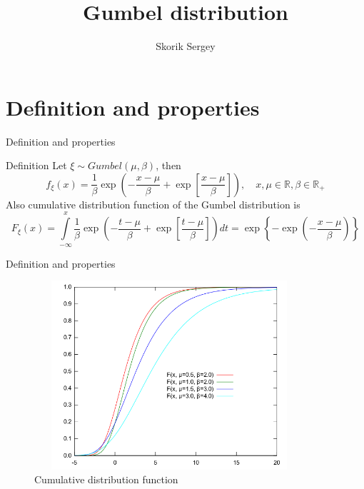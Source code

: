 \documentclass{beamer}
\title{Gumbel distribution}
\author{Skorik Sergey}
\institute{MIPT, 2022}
\begin{document}
\begin{frame}
    \titlepage
\end{frame}


\begin{frame}
    \tableofcontents
\end{frame}


\section{Definition and properties}

\begin{frame}{Definition and properties}
    \begin{block}{Definition}
    Let $\xi \sim Gumbel(\mu, \beta)$, then
    \begin{equation}
        \label{gumbel_pdf}
        f_{\xi}(x) = \dfrac{1}{\beta}\exp{\left(-\dfrac{x - \mu}{\beta} + \exp{\left[\dfrac{x - \mu}{\beta}\right]}\right)}, \quad x, \mu \in \mathbb{R}, \beta \in \mathbb{R}_+
    \end{equation}
    Also cumulative distribution function of the Gumbel distribution is
    \begin{equation}
        \label{gumbel_cdf}
        F_\xi(x) = \int\limits_{-\infty}^x \dfrac{1}{\beta}\exp{\left(-\dfrac{t - \mu}{\beta} + \exp{\left[\dfrac{t - \mu}{\beta}\right]}\right)}dt = \exp\left\{-\exp{\left(-\dfrac{x - \mu}{\beta}\right)}\right\}
    \end{equation}
    \end{block}

\end{frame}

\begin{frame}{Definition and properties}
    \begin{figure}[h]
\caption{Cumulative distribution function}
\centering
\includegraphics[width=10cm, height=7cm]{Gumbel-Cumulative.png}
\end{figure}

\end{frame}
\end{document}
